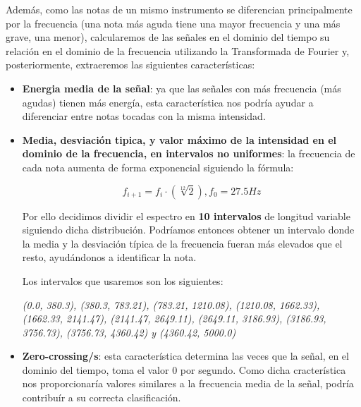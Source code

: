 \documentclass[12pt]{article}
\begin{document}

\bigskip
Además, como las notas de un mismo instrumento se diferencian principalmente por la frecuencia (una nota más aguda tiene una mayor frecuencia
y una más grave, una menor), calcularemos de las señales en el dominio del tiempo su relación en el dominio de la frecuencia utilizando la
Transformada de Fourier y, posteriormente, extraeremos las siguientes características:
\begin{itemize}
	\item \textbf{Energia media de la señal}: ya que las señales con más frecuencia (más agudas) tienen más energía, esta característica nos podría
		ayudar a diferenciar entre notas tocadas con la misma intensidad.
	\item \textbf{Media, desviación tipica, y valor máximo de la intensidad en el dominio de la frecuencia, en intervalos no uniformes}: la frecuencia de cada nota
		aumenta de forma exponencial siguiendo la fórmula:

		\begin{equation}
			f_{i+1} = f_{i}\cdot(\sqrt[12]{2}), f_0 = 27.5 Hz
		\end{equation}

		Por ello decidimos dividir el espectro en \textbf{10 intervalos} de longitud variable siguiendo dicha distribución. 
		Podríamos entonces obtener un intervalo donde la media y la desviación típica de la frecuencia fueran más elevados que el resto,
		ayudándonos a identificar la nota.
		
		Los intervalos que usaremos son los siguientes:
		
		\textit{(0.0, 380.3), (380.3, 783.21), (783.21, 1210.08), (1210.08, 1662.33),\newline
		(1662.33, 2141.47), (2141.47, 2649.11), (2649.11, 3186.93), (3186.93, 3756.73), 
		(3756.73, 4360.42) y (4360.42, 5000.0)}
	\item \textbf{Zero-crossing/s}: esta característica determina las veces que la señal, en el dominio del tiempo, toma el valor 0 por segundo.
		Como dicha cracterística nos proporcionaría valores similares a la frecuencia media de la señal, podría contribuír a su correcta clasificación.
\end{itemize}
\end{document}
